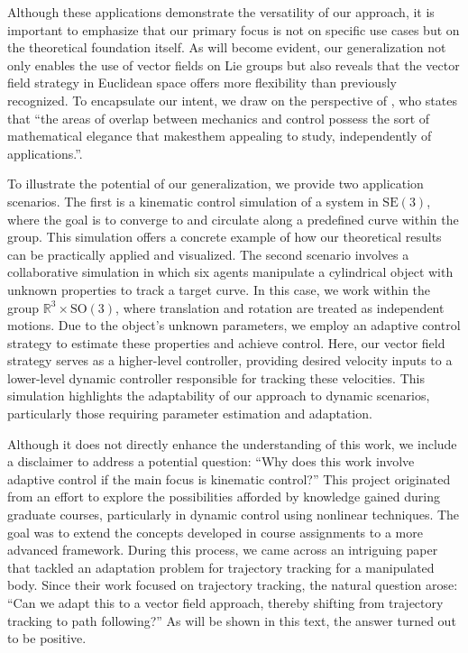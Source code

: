 Although these applications demonstrate the versatility of our approach, it is important to emphasize that our primary focus is not on specific use cases but on the theoretical foundation itself. As will become evident, our generalization not only enables the use of vector fields on Lie groups but also reveals that the vector field strategy in Euclidean space offers more flexibility than previously recognized. To encapsulate our intent, we draw on the perspective of \citet{Bullo2004}, who states that ``the areas of overlap between mechanics and control possess the sort of mathematical elegance that makesthem appealing to study, independently of applications.''.

To illustrate the potential of our generalization, we provide two application scenarios. The first is a kinematic control simulation of a system in $\text{SE}(3)$, where the goal is to converge to and circulate along a predefined curve within the group. This simulation offers a concrete example of how our theoretical results can be practically applied and visualized. The second scenario involves a collaborative simulation in which six agents manipulate a cylindrical object with unknown properties to track a target curve. In this case, we work within the group $\mathbb{R}^3\times\text{SO}(3)$, where translation and rotation are treated as independent motions. Due to the object's unknown parameters, we employ an adaptive control strategy to estimate these properties and achieve control. Here, our vector field strategy serves as a higher-level controller, providing desired velocity inputs to a lower-level dynamic controller responsible for tracking these velocities. This simulation highlights the adaptability of our approach to dynamic scenarios, particularly those requiring parameter estimation and adaptation.

Although it does not directly enhance the understanding of this work, we include a disclaimer to address a potential question: ``Why does this work involve adaptive control if the main focus is kinematic control?'' This project originated from an effort to explore the possibilities afforded by knowledge gained during graduate courses, particularly in dynamic control using nonlinear techniques. The goal was to extend the concepts developed in course assignments to a more advanced framework. During this process, we came across an intriguing paper \citep{Culbertson2021} that tackled an adaptation problem for trajectory tracking for a manipulated body. Since their work focused on trajectory tracking, the natural question arose: ``Can we adapt this to a vector field approach, thereby shifting from trajectory tracking to path following?'' As will be shown in this text, the answer turned out to be positive.

